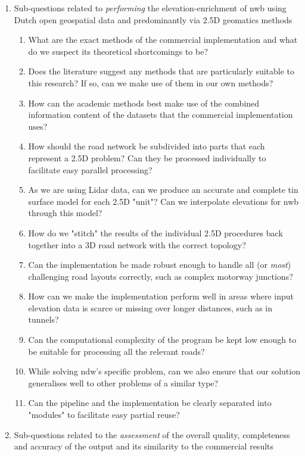 \begin{enumerate}
    \item Sub-questions related to \textit{performing} the elevation-enrichment of \ac{nwb} using Dutch open geospatial data and predominantly via 2.5D geomatics methods
    \begin{enumerate}
        \item What are the exact methods of the commercial implementation and what do we suspect its theoretical shortcomings to be?
        \item Does the literature suggest any methods that are particularly suitable to this research? If so, can we make use of them in our own methods?
        \item How can the academic methods best make use of the combined information content of the datasets that the commercial implementation uses?
        \item How should the road network be subdivided into parts that each represent a 2.5D problem? Can they be processed individually to facilitate easy parallel processing?
        \item As we are using Lidar data, can we produce an accurate and complete \ac{tin} surface model for each 2.5D "unit"? Can we interpolate elevations for \ac{nwb} through this model?
        \item How do we "stitch" the results of the individual 2.5D procedures back together into a 3D road network with the correct topology?
        \item Can the implementation be made robust enough to handle all (or \textit{most}) challenging road layouts correctly, such as complex motorway junctions?
        \item How can we make the implementation perform well in areas where input elevation data is scarce or missing over longer distances, such as in tunnels?
        \item Can the computational complexity of the program be kept low enough to be suitable for processing all the relevant roads?
        \item While solving \ac{ndw}'s specific problem, can we also ensure that our solution generalises well to other problems of a similar type?
        \item Can the pipeline and the implementation be clearly separated into "modules" to facilitate easy partial reuse?
    \end{enumerate}
    \item Sub-questions related to the \textit{assessment} of the overall quality, completeness and accuracy of the output and its similarity to the commercial results

\end{enumerate}
